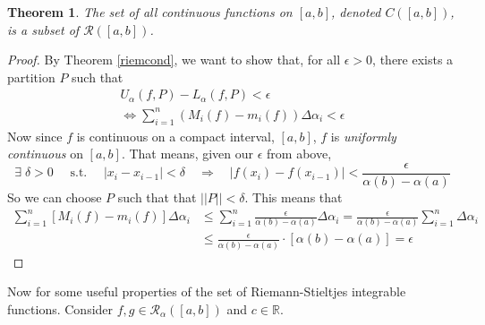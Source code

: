 \documentclass[12pt]{article}
\theoremstyle{plain}
\newtheorem{thm}{Theorem}[subsection]
\theoremstyle{definition}
\theoremstyle{remark}
\begin{document}
\begin{thm} 
    \label{contthm}    
The set of all continuous functions on $[a,b]$, denoted ${C}([a,b])$, is a subset of $\mathscr{R}([a,b])$.
\end{thm}
\begin{proof} 
By Theorem \ref{riemcond}, we want to show that, for all $\epsilon>0$, there exists a partition $P$ such that 
\begin{align*}
    U_\alpha(f,P) - L_\alpha(f,P) < \epsilon  \\
    \Leftrightarrow
    \sum^n_{i=1} (M_i(f) - m_i(f)) \Delta\alpha_i < \epsilon 
\end{align*}
Now since $f$ is continuous on a compact interval, $[a,b]$, $f$ is \emph{uniformly continuous} on $[a,b]$. That means, given our $\epsilon$ from above, 
    \[ \exists \; \delta >0 \quad \text{ s.t. } \quad
        |x_{i} - x_{i-1}| < \delta \quad \Rightarrow \quad
        |f(x_{i}) - f(x_{i-1})| < \frac{\epsilon}{\alpha(b)-\alpha(a)} \]
So we can choose $P$ such that that $||P|| < \delta$.  This means that 
\begin{align*}
    \sum^n_{i=1} [M_i(f) - m_i(f)] \Delta\alpha_i &\leq
    \sum^n_{i=1} \frac{\epsilon}{\alpha(b)-\alpha(a)} 
        \Delta\alpha_i  
    =\frac{\epsilon}{\alpha(b)-\alpha(a)}\sum^n_{i=1}  
        \Delta\alpha_i \\
    &\leq\frac{\epsilon}{\alpha(b)-\alpha(a)} \cdot [\alpha(b)-\alpha(a)] = \epsilon
\end{align*}
\end{proof}
Now for some useful properties of the set of Riemann-Stieltjes integrable functions. Consider $f,g \in \mathscr{R}_\alpha([a,b])$
and $c \in \mathbb{R}$.
\end{document}
